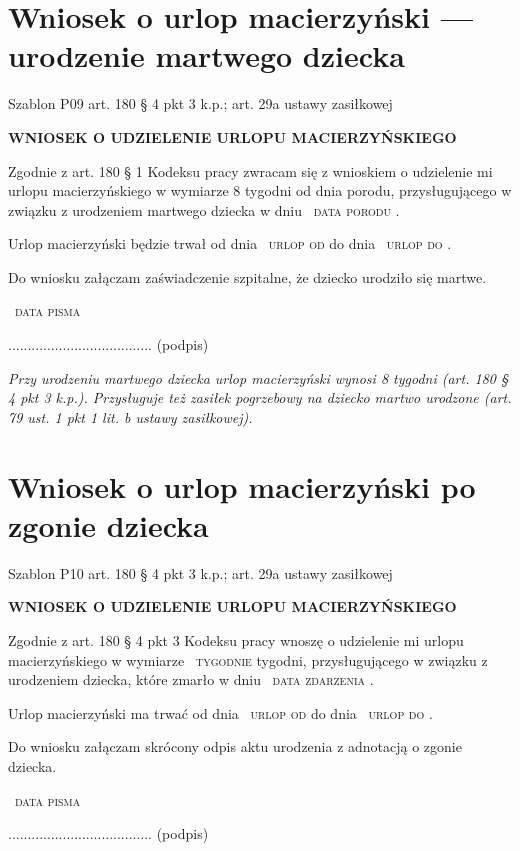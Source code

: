 \documentclass[11pt,a4paper]{article}
\newcommand{\Pole}[1]{%
  \textcolor{szary}{\dotfill}\,%
  {\scriptsize\textcolor{szary}{\textsc{#1}}}%
}
\newcommand{\NaglowekPisma}[1]{%
  \par\vspace{0.8em}%
  \begin{center}%
    {\large\bfseries\MakeUppercase{#1}}%
  \end{center}%
  \vspace{0.4em}%
}
\begin{document}
\clearpage

\section{Wniosek o urlop macierzyński --- urodzenie martwego dziecka}

{\small\color{szary}Szablon P09 \textbullet{} art. 180 \S{} 4 pkt 3 k.p.; art. 29a ustawy zasiłkowej}

\NaglowekPisma{WNIOSEK O UDZIELENIE URLOPU MACIERZYŃSKIEGO}

Zgodnie z art. 180 \S{} 1 Kodeksu pracy zwracam się z wnioskiem o udzielenie mi
urlopu macierzyńskiego w wymiarze 8 tygodni od dnia porodu, przysługującego
w związku z urodzeniem martwego dziecka w dniu \Pole{data porodu}.

Urlop macierzyński będzie trwał od dnia \Pole{urlop od} do dnia \Pole{urlop do}.

Do wniosku załączam zaświadczenie szpitalne, że dziecko urodziło się martwe.

\Pole{data pisma}
.....................................
(podpis)

\vfill
{\footnotesize\color{szary}\itshape Przy urodzeniu martwego dziecka urlop macierzyński wynosi 8 tygodni (art. 180 \S{} 4 pkt 3 k.p.). Przysługuje też zasiłek pogrzebowy na dziecko martwo urodzone (art. 79 ust. 1 pkt 1 lit. b ustawy zasiłkowej). }

\clearpage

\section{Wniosek o urlop macierzyński po zgonie dziecka}

{\small\color{szary}Szablon P10 \textbullet{} art. 180 \S{} 4 pkt 3 k.p.; art. 29a ustawy zasiłkowej}

\NaglowekPisma{WNIOSEK O UDZIELENIE URLOPU MACIERZYŃSKIEGO}

Zgodnie z art. 180 \S{} 4 pkt 3 Kodeksu pracy wnoszę o udzielenie mi urlopu
macierzyńskiego w wymiarze \Pole{tygodnie} tygodni, przysługującego w związku
z urodzeniem dziecka, które zmarło w dniu \Pole{data zdarzenia}.

Urlop macierzyński ma trwać od dnia \Pole{urlop od} do dnia \Pole{urlop do}.

Do wniosku załączam skrócony odpis aktu urodzenia z adnotacją o zgonie dziecka.

\Pole{data pisma}
.....................................
(podpis)
\end{document}
